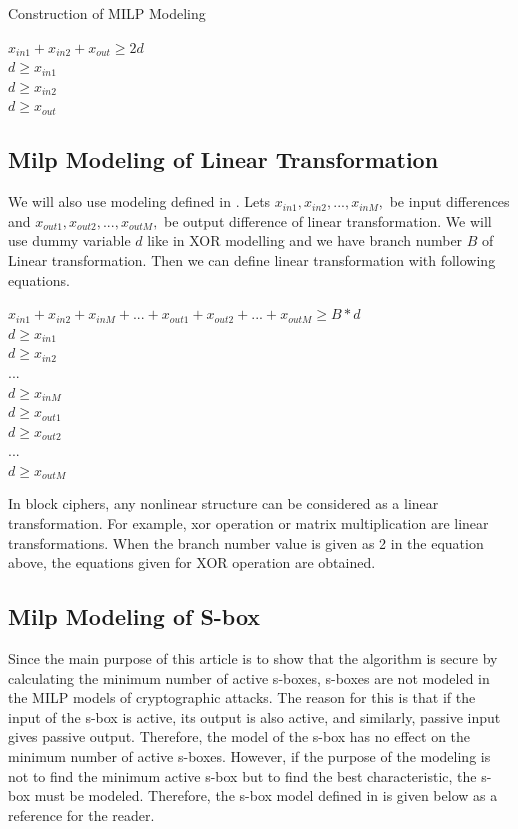 \documentclass [version=final]{iacrcc}
\begin{document}
\begin{section}{Construction of MILP Modeling}
\begin{center}
    $x_{in1} + x_{in2} + x_{out} \geq 2d $ \\
    $d \geq x_{in1} $ \\
    $d \geq x_{in2} $ \\
    $d \geq x_{out} $ 
\end{center}

\subsection{Milp Modeling of Linear Transformation }
We will also use modeling defined in \cite{mouha2012differential}. Lets $x_{in1}, x_{in2}, ... ,x_{inM}, $ be input differences and $x_{out1}, x_{out2}, ... ,x_{outM}, $ be output difference of linear transformation. We will use dummy variable $d$ like in XOR modelling and we have branch number $B$ of Linear transformation. Then we can define linear transformation with following equations. 

\begin{center}
    $x_{in1} + x_{in2} + x_{inM} + ... + x_{out1} + x_{out2} + ... + x_{outM}  \geq B*d $ \\
    $d \geq x_{in1} $ \\
    $d \geq x_{in2} $ \\
    $...$\\
    $d \geq x_{inM} $ \\
    $d \geq x_{out1} $\\
    $d \geq x_{out2} $ \\
    $...$\\
    $d \geq x_{outM} $
\end{center}

In block ciphers, any nonlinear structure can be considered as a linear transformation. For example, xor operation or matrix multiplication are linear transformations. When the branch number value is given as 2 in the equation above, the equations given for XOR operation are obtained.

\subsection{Milp Modeling of S-box}

Since the main purpose of this article is to show that the algorithm is secure by calculating the minimum number of active s-boxes, s-boxes are not modeled in the MILP models of cryptographic attacks. The reason for this is that if the input of the s-box is active, its output is also active, and similarly, passive input gives passive output. Therefore, the model of the s-box has no effect on the minimum number of active s-boxes. However, if the purpose of the modeling is not to find the minimum active s-box but to find the best characteristic, the s-box must be modeled. Therefore, the s-box model defined in \cite{sun2014automatic} is given below as a reference for the reader.


\end{section}
\end{document}
